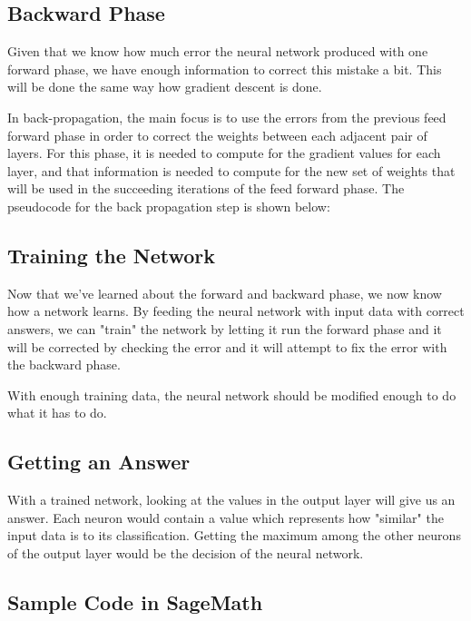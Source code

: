 \documentclass[a4paper, 11pt, english]{article}
\begin{document}
\subsection{Backward Phase}
\par Given that we know how much error the neural network produced with one forward phase, we have enough information to correct this mistake a bit. This will be done the same way how gradient descent is done.
\par In back-propagation, the main focus is to use the errors from the previous feed forward phase in order to correct the weights between each adjacent pair of layers. For this phase, it is needed to compute for the gradient values for each layer, and that information is needed to compute for the new set of weights that will be used in the succeeding iterations of the feed forward phase. The pseudocode for the back propagation step is shown below:


\subsection{Training the Network}
\par Now that we've learned about the forward and backward phase, we now know how a network learns. By feeding the neural network with input data with correct answers, we can "train" the network by letting it run the forward phase and it will be corrected by checking the error and it will attempt to fix the error with the backward phase.
\par With enough training data, the neural network should be modified enough to do what it has to do.

\subsection{Getting an Answer}
\par With a trained network, looking at the values in the output layer will give us an answer. Each neuron would contain a value which represents how "similar" the input data is to its classification. Getting the maximum among the other neurons of the output layer would be the decision of the neural network.

\subsection{Sample Code in SageMath}
\end{document}
